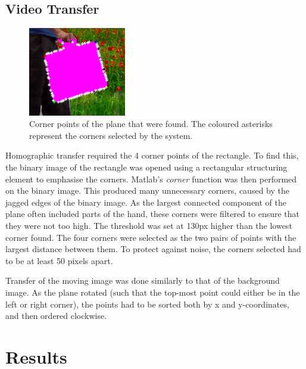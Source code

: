 \documentclass[11pt]{article}
\begin{document}
\subsection{Video Transfer}

\begin{figure}
  \vspace{-20pt}
  \begin{center}
    \includegraphics[width=0.38\textwidth]{corners}
  \end{center}
  \vspace{-17pt}
  \caption{Corner points of the plane that were found. The coloured asterisks represent the corners selected by the system.}
  \vspace{-25pt}
\end{figure}

Homographic transfer required the 4 corner points of the rectangle. To find this, the binary image of the rectangle was opened using a rectangular structuring element to emphasise the corners. Matlab's \emph{corner} function was then performed on the binary image. This produced many unnecessary corners, caused by the jagged edges of the binary image. As the largest connected component of the plane often included parts of the hand, these corners were filtered to ensure that they were not too high. The threshold was set at 130px higher than the lowest corner found. The four corners were selected as the two pairs of points with the largest distance between them. To protect against noise,  the corners selected had to be at least 50 pixels apart. 

Transfer of the moving image was done similarly to that of the background image. As the plane rotated (such that the top-most point could either be in the left or right corner), the points had to be sorted both by x and y-coordinates, and then ordered clockwise.

\section{Results}
\end{document}
